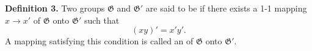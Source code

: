 \textbf{Definition 3.} Two groups $\mathfrak{G}$ and $\mathfrak{G}'$ are said to be  if there exists a 1-1 mapping $x \to x'$ of $\mathfrak{G}$ onto $\mathfrak{G}'$ such that
$$(xy)' = x'y'.$$
A mapping satisfying this condition is called an  of $\mathfrak{G}$ onto $\mathfrak{G}'$.
